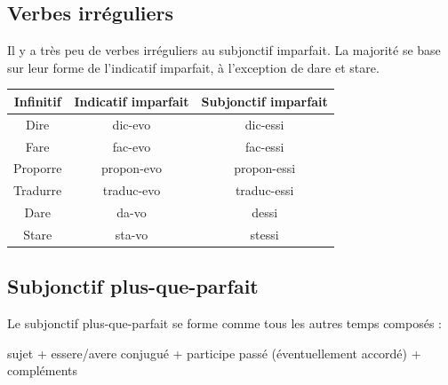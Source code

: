 \documentclass[12pt, openany]{report}
\begin{document}
\subsection{Verbes irréguliers}
Il y a très peu de verbes irréguliers au subjonctif imparfait. La majorité se base sur leur forme de l'indicatif imparfait, à l'exception de dare et stare. 
\begin{center}
    \begin{tabular}{c|c|c}
        Infinitif & Indicatif imparfait & Subjonctif imparfait\\ \hline 
        Dire & dic-evo & dic-essi \\
        Fare & fac-evo & fac-essi\\
        Proporre & propon-evo & propon-essi\\
        Tradurre & traduc-evo & traduc-essi\\
        Dare & da-vo & dessi\\
        Stare & sta-vo & stessi
    \end{tabular}
\end{center}
\subsection{Subjonctif plus-que-parfait}
Le subjonctif plus-que-parfait se forme comme tous les autres temps composés : 
\begin{center}
    sujet + essere/avere conjugué + participe passé (éventuellement accordé) + compléments 
\end{center}
\end{document}
